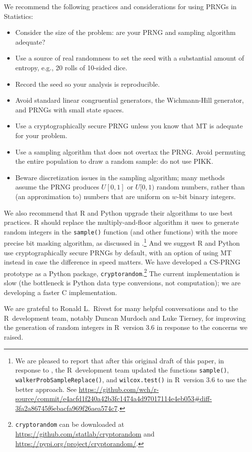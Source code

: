 \documentclass[graybox]{svmult}
\begin{document}
We recommend the following practices and considerations for using PRNGs in Statistics:
\begin{itemize}
\item Consider the size of the problem: are your PRNG and sampling algorithm adequate?
\item Use a source of real randomness to set the seed with a substantial amount of entropy, e.g., 20 rolls of 10-sided dice.
\item Record the seed so your analysis is reproducible.
\item Avoid standard linear congruential generators, the Wichmann-Hill generator, and PRNGs with small state spaces.
\item Use a cryptographically secure PRNG unless you know that MT is adequate for your problem.
\item Use a sampling algorithm that does not overtax the PRNG. Avoid permuting the entire population to draw a random sample: do not use PIKK.
\item Beware discretization issues in the sampling algorithm; many methods assume the PRNG produces $U[0,1]$ or $U[0,1)$ random numbers, rather than (an approximation to) numbers that are uniform on $w$-bit binary integers.
\end{itemize}


We also recommend that R and Python upgrade their algorithms to use best practices.
R should replace the multiply-and-floor algorithm it uses to generate random integers in the \texttt{sample()} function (and other functions) with the more precise bit masking algorithm, as discussed
in \cite{ottoboniStark18}.\footnote{%
  We are pleased to report that after this original draft of this paper, in response to \cite{ottoboniStark18}, the R~development team updated the functions \texttt{sample()}, \texttt{walkerProbSampleReplace()}, and \texttt{wilcox.test()} 
  in R~version 3.6 to use the better approach. See \url{https://github.com/wch/r-source/commit/e4acfd1f240a42b3fc1474a4d97017114e4eb053\#diff-3fa2a86745f6ebacfa969f26aea574c7}.
}
And we suggest R and Python use cryptographically secure PRNGs by default, with an option of using MT instead in case the difference in speed matters.
We have developed a CS-PRNG prototype as a Python package, \texttt{cryptorandom}.\footnote{ %
\texttt{cryptorandom} can be downloaded at \url{https://github.com/statlab/cryptorandom} and \url{https://pypi.org/project/cryptorandom/}.
} %
The current implementation is slow (the bottleneck is Python data type conversions, not computation);
we are developing a faster C implementation.

\begin{acknowledgement}
We are grateful to Ronald L.~Rivest for many helpful conversations and to the R~development team, notably Duncan Murdoch and Luke Tierney, for improving the generation of random integers in R~version 3.6 in response to the concerns we raised.
\end{acknowledgement}




\end{document}

